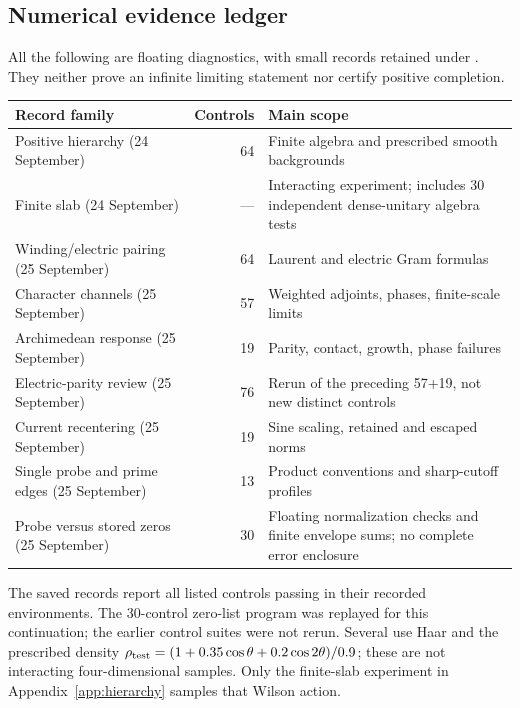 \subsection{Numerical evidence ledger}
All the following are floating diagnostics, with small
records retained under .
They neither prove an infinite limiting statement nor
certify positive completion.
\begin{center}
\begin{tabularx}{\textwidth}{@{}XrX@{}}
\toprule
Record family & Controls & Main scope\\
\midrule
Positive hierarchy (24 September) & 64 &
Finite algebra and prescribed smooth backgrounds\\
Finite slab (24 September) & --- &
Interacting experiment; includes 30 independent dense-unitary algebra tests\\
Winding/electric pairing (25 September) & 64 &
Laurent and electric Gram formulas\\
Character channels (25 September) & 57 &
Weighted adjoints, phases, finite-scale limits\\
Archimedean response (25 September) & 19 &
Parity, contact, growth, phase failures\\
Electric-parity review (25 September) & 76 &
Rerun of the preceding 57+19, not new distinct controls\\
Current recentering (25 September) & 19 &
Sine scaling, retained and escaped norms\\
Single probe and prime edges (25 September) & 13 &
Product conventions and sharp-cutoff profiles\\
Probe versus stored zeros (25 September) & 30 &
Floating normalization checks and finite envelope sums;
no complete error enclosure\\
\bottomrule
\end{tabularx}
\end{center}
The saved records report all listed controls passing
in their recorded environments. The 30-control zero-list
program was replayed for this continuation; the earlier
control suites were not rerun. Several use
Haar and the prescribed density
$\rho_{\rm test}=(1+0.35\cos\theta+0.2\cos2\theta)/0.9$;
these are not interacting four-dimensional samples.
Only the finite-slab experiment in
Appendix~\ref{app:hierarchy} samples that Wilson action.

